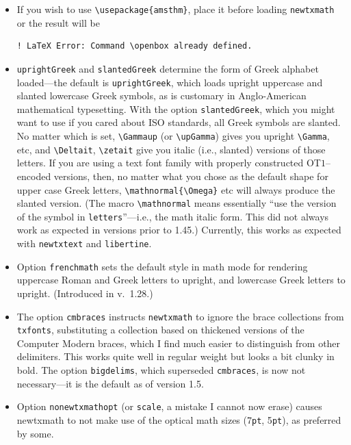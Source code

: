 \documentclass[11pt]{article}
\theoremstyle{oldplain}
\theoremstyle{plain}
\begin{document}
\begin{itemize}
\item If you wish to use \verb|\usepackage{amsthm}|, place it before loading {\tt newtxmath} or the result will  be
\begin{verbatim}
! LaTeX Error: Command \openbox already defined.
\end{verbatim}
\item {\tt uprightGreek} and {\tt slantedGreek} determine the form of Greek alphabet loaded---the default is {\tt uprightGreek}, which loads upright uppercase and slanted lowercase Greek symbols, as is customary in Anglo-American mathematical typesetting. With the option {\tt slantedGreek}, which you might want to use if you cared about ISO standards, all Greek symbols are slanted. No matter which is set, \verb|\Gammaup| (or \verb|\upGamma|) gives you upright \verb|\Gamma|, etc, and \verb|\Deltait|, \verb|\zetait| give you italic (i.e., slanted) versions of those letters. If you are using a text font family with properly constructed OT$1$--encoded versions, then, no matter what you chose as the default shape for upper case Greek letters, \verb|\mathnormal{\Omega}| etc will always produce the slanted version. (The macro \verb|\mathnormal| means essentially ``use the version of the symbol in {\tt letters}''---i.e., the math italic form. This did not always work as expected in versions prior to 1.45.) Currently, this works as expected with {\tt newtxtext} and {\tt libertine}. 
\item Option {\tt frenchmath} sets the default style in math mode for rendering uppercase Roman and Greek letters to upright, and lowercase Greek letters to upright. (Introduced in v.\ 1.28.)
\item The option {\tt cmbraces} instructs {\tt newtxmath} to ignore the brace collections from {\tt txfonts}, substituting a collection based on thickened versions of the Computer Modern braces, which I find much easier to distinguish from other delimiters. This works quite well in regular weight but looks a bit clunky in bold. The option {\tt bigdelims}, which superseded {\tt cmbraces}, is now not necessary---it is the default as of version 1.5.
\item Option {\tt nonewtxmathopt} (or {\tt scale}, a mistake I cannot now erase) causes newtxmath to not make use of the optical math sizes (7{\tt pt}, 5{\tt pt}), as preferred by some.

\end{itemize}
\end{document}
